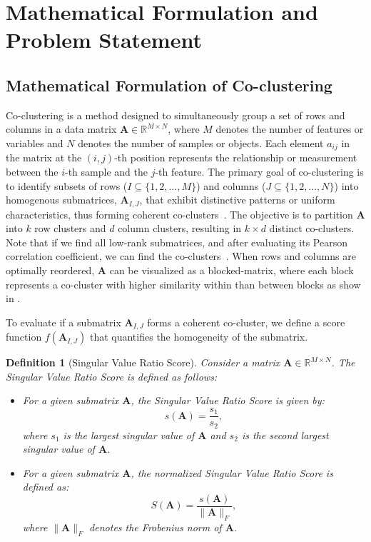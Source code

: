 \documentclass[journal]{IEEEtran}
\newtheorem{definition}{Definition}
\renewcommand{\cite}[1]{~\autocite{#1}}
\begin{document}
\section{Mathematical Formulation and Problem Statement}\label{sec:formula}


\subsection{Mathematical Formulation of Co-clustering}
Co-clustering is a method designed to simultaneously group a set of rows and columns in a data matrix $\mathbf{A} \in \mathbb{R}^{M \times N}$, where $M$ denotes the number of features or variables and $N$ denotes the number of samples or objects. Each element $a_{ij}$ in the matrix at the $(i, j)$-th position represents the relationship or measurement between the $i$-th sample and the $j$-th feature. The primary goal of co-clustering is to identify subsets of rows ($I\subseteq \{1, 2, \ldots, M\}$) and columns ($J\subseteq \{1, 2, \ldots, N\}$) into homogenous submatrices, $\mathbf{A}_{I, J}$, that exhibit distinctive patterns or uniform characteristics, thus forming coherent co-clusters\cite{zhao2017DetectionCorrelatedCoclusters}. The objective is to partition $\mathbf{A}$ into $k$ row clusters and $d$ column clusters, resulting in $k \times d$ distinct co-clusters. Note that if we find all low-rank submatrices, and after evaluating its Pearson correlation coefficient, we can find the co-clusters\cite{zhao2016IdentifyingMultidimensionalCoclusters}. When rows and columns are optimally reordered, $\mathbf{A}$ can be visualized as a blocked-matrix, where each block represents a co-cluster with higher similarity within than between blocks as show in .

To evaluate if a submatrix $\mathbf{A}_{I, J}$ forms a coherent co-cluster, we define a score function \( f(\mathbf{A}_{I, J}) \) that quantifies the homogeneity of the submatrix.

\begin{definition}[Singular Value Ratio Score]
  \label{def:co_cluster}
  Consider a matrix \(\mathbf{A} \in \mathbb{R}^{M \times N}\). The Singular Value Ratio Score is defined as follows:
  \begin{itemize}
    \item For a given submatrix \(\mathbf{A}\), the Singular Value Ratio Score is given by:
          \[
            s(\mathbf{A}) = \frac{s_1}{s_2},
          \]
          where \(s_1\) is the largest singular value of \(\mathbf{A}\) and \(s_2\) is the second largest singular value of \(\mathbf{A}\).
    \item For a given submatrix \(\mathbf{A}\), the normalized Singular Value Ratio Score is defined as:
          \[
            S(\mathbf{A}) = \frac{s(\mathbf{A})}{\|\mathbf{A}\|_F},
          \]
          where \(\|\mathbf{A}\|_F\) denotes the Frobenius norm of \(\mathbf{A}\).
  \end{itemize}
\end{definition}
\end{document}
